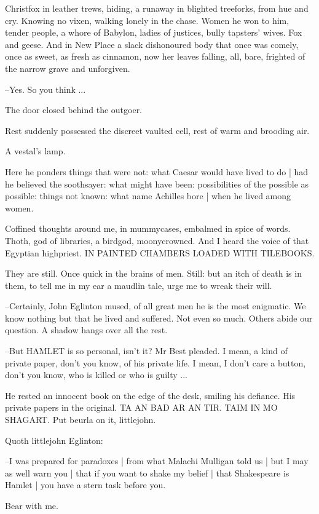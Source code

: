 Christfox in leather trews,
hiding,
a runaway in blighted treeforks,
from hue and cry.
Knowing no vixen,
walking lonely in the chase.
Women he won to him,
tender people,
a whore of Babylon,
ladies of justices,
bully tapsters' wives.
Fox and geese.
And in New Place
a slack dishonoured body that once was comely,
once as sweet,
as fresh as cinnamon,
now her leaves falling,
all,
bare,
frighted of the narrow grave
and unforgiven.

--Yes.
So you think ...

The door closed behind the outgoer.

Rest suddenly possessed the discreet vaulted cell,
rest of warm and brooding air.

A vestal's lamp.

Here he ponders things that were not:
what Caesar would have lived to do |
had he believed the soothsayer:
what might have been:
possibilities of the possible as possible:
things not known:
what name Achilles bore |
when he lived among women.

Coffined thoughts around me,
in mummycases,
embalmed in spice of words.
Thoth,
god of libraries,
a birdgod,
moonycrowned.
And I heard the voice of that Egyptian highpriest.
IN PAINTED CHAMBERS LOADED WITH TILEBOOKS.

They are still.
Once quick in the brains of men.
Still:
but an itch of death is in them,
to tell me in my ear a maudlin tale,
urge me to wreak their will.

--Certainly,
John Eglinton mused,
of all great men he is the most enigmatic.
We know nothing but that he lived and suffered.
Not even so much.
Others abide our question.
A shadow hangs over all the rest.

--But HAMLET is so personal,
isn't it?
Mr Best pleaded.
I mean,
a kind of private paper,
don't you know,
of his private life.
I mean,
I don't care a button,
don't you know,
who is killed or who is guilty ...

He rested an innocent book on the edge of the desk,
smiling his defiance.
His private papers in the original.
TA AN BAD AR AN TIR.
TAIM IN MO SHAGART.
Put beurla on it,
littlejohn.

Quoth littlejohn Eglinton:

--I was prepared for paradoxes |
from what Malachi Mulligan told us |
but I may as well warn you |
that if you want to shake my belief |
that Shakespeare is Hamlet |
you have a stern task before you.

Bear with me.

